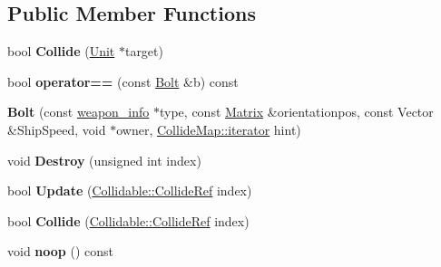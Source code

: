 \subsection*{Public Member Functions}
\begin{DoxyCompactItemize}
\item 
bool {\bfseries Collide} (\hyperlink{classUnit}{Unit} $\ast$target)\hypertarget{classBolt_a7a4c15e452ed78369badcf0b806ece5d}{}\label{classBolt_a7a4c15e452ed78369badcf0b806ece5d}

\item 
bool {\bfseries operator==} (const \hyperlink{classBolt}{Bolt} \&b) const \hypertarget{classBolt_a8597b8a16f7de47e83eed61931c4f9da}{}\label{classBolt_a8597b8a16f7de47e83eed61931c4f9da}

\item 
{\bfseries Bolt} (const \hyperlink{structweapon__info}{weapon\+\_\+info} $\ast$type, const \hyperlink{classMatrix}{Matrix} \&orientationpos, const Vector \&Ship\+Speed, void $\ast$owner, \hyperlink{classCollidable}{Collide\+Map\+::iterator} hint)\hypertarget{classBolt_a7f02e3eabd6c5f0426d3d18cf509d873}{}\label{classBolt_a7f02e3eabd6c5f0426d3d18cf509d873}

\item 
void {\bfseries Destroy} (unsigned int index)\hypertarget{classBolt_a3055e88bafe429b0a9af1cf1fe1164e8}{}\label{classBolt_a3055e88bafe429b0a9af1cf1fe1164e8}

\item 
bool {\bfseries Update} (\hyperlink{unionCollidable_1_1CollideRef}{Collidable\+::\+Collide\+Ref} index)\hypertarget{classBolt_aa7e688f1ef4621df1c66fde43c253841}{}\label{classBolt_aa7e688f1ef4621df1c66fde43c253841}

\item 
bool {\bfseries Collide} (\hyperlink{unionCollidable_1_1CollideRef}{Collidable\+::\+Collide\+Ref} index)\hypertarget{classBolt_ae3006858a90917c9ca3a1ae62ef7235b}{}\label{classBolt_ae3006858a90917c9ca3a1ae62ef7235b}

\item 
void {\bfseries noop} () const \hypertarget{classBolt_a2e4cd3f23945cebdfc4f1c79b0b2adc3}{}\label{classBolt_a2e4cd3f23945cebdfc4f1c79b0b2adc3}

\end{DoxyCompactItemize}
